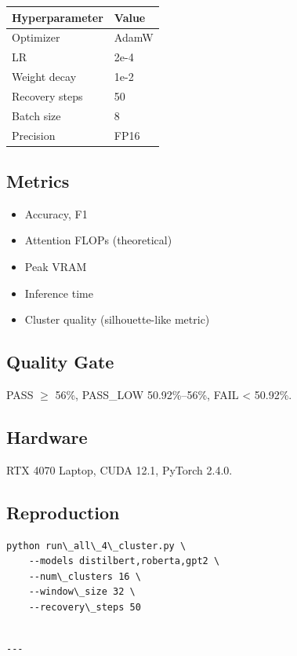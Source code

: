 \begin{table}[H]
\centering
\small
\begin{tabular}{ll}
\toprule
\textbf{Hyperparameter} & \textbf{Value} \\
\midrule
Optimizer & AdamW \\
LR & 2e-4 \\
Weight decay & 1e-2 \\
Recovery steps & 50 \\
Batch size & 8 \\
Precision & FP16 \\
\bottomrule
\end{tabular}
\end{table}

\subsection{Metrics}

\begin{itemize}
\item Accuracy, F1
\item Attention FLOPs (theoretical)
\item Peak VRAM
\item Inference time
\item Cluster quality (silhouette-like metric)

\end{itemize}
\subsection{Quality Gate}

PASS $\ge$ 56\%, PASS\_LOW 50.92\%--56\%, FAIL \textless{} 50.92\%.

\subsection{Hardware}

RTX 4070 Laptop, CUDA 12.1, PyTorch 2.4.0.

\subsection{Reproduction}

\begin{lstlisting}
python run\_all\_4\_cluster.py \
    --models distilbert,roberta,gpt2 \
    --num\_clusters 16 \
    --window\_size 32 \
    --recovery\_steps 50
\end{lstlisting}
\begin{lstlisting}

---
\end{lstlisting}